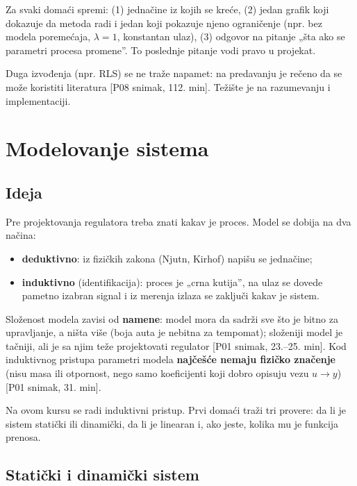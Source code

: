 \documentclass[11pt,a4paper,parskip=half,headsepline,numbers=noenddot]{scrartcl}
\DeclareRobustCommand{\izvor}[1]{{\small\color{izvorC}[#1]}}
\begin{document}
\begin{ispit}
Za svaki domaći spremi: (1) jednačine iz kojih se kreće, (2) jedan grafik koji dokazuje da metoda radi i jedan koji pokazuje njeno ograničenje (npr. bez modela poremećaja, \(\lambda = 1\), konstantan ulaz), (3) odgovor na pitanje „šta ako se parametri procesa promene''. To poslednje pitanje vodi pravo u projekat.

Duga izvođenja (npr. RLS) se ne traže napamet: na predavanju je rečeno da se može koristiti literatura \izvor{P08 snimak, 112. min}. Težište je na razumevanju i implementaciji.
\end{ispit}

\section{Modelovanje sistema}

\subsection{Ideja}

Pre projektovanja regulatora treba znati kakav je proces. Model se dobija na dva načina:

\begin{itemize}
\item \textbf{deduktivno}: iz fizičkih zakona (Njutn, Kirhof) napišu se jednačine;
\item \textbf{induktivno} (identifikacija): proces je „crna kutija'', na ulaz se dovede pametno izabran signal i iz merenja izlaza se zaključi kakav je sistem.
\end{itemize}

Složenost modela zavisi od \textbf{namene}: model mora da sadrži sve što je bitno za upravljanje, a ništa više (boja auta je nebitna za tempomat); složeniji model je tačniji, ali je sa njim teže projektovati regulator \izvor{P01 snimak, 23.--25. min}. Kod induktivnog pristupa parametri modela \textbf{najčešće nemaju fizičko značenje} (nisu masa ili otpornost, nego samo koeficijenti koji dobro opisuju vezu \(u \to y\)) \izvor{P01 snimak, 31. min}.

Na ovom kursu se radi induktivni pristup. Prvi domaći traži tri provere: da li je sistem statički ili dinamički, da li je linearan i, ako jeste, kolika mu je funkcija prenosa.

\subsection{Statički i dinamički sistem}
\end{document}
